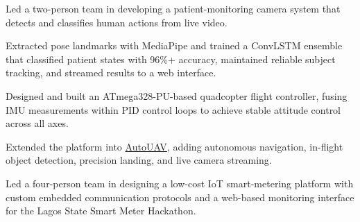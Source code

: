 
\begin{details}
    \item Led a two-person team in developing a patient-monitoring camera system that detects and classifies human actions from live video.
    \item Extracted pose landmarks with MediaPipe and trained a ConvLSTM ensemble that classified patient states with 96\%+ accuracy, maintained reliable subject tracking, and streamed results to a web interface.
\end{details}

\begin{details}
    \item Designed and built an ATmega328-PU-based quadcopter flight controller, fusing IMU measurements within PID control loops to achieve stable attitude control across all axes.
    \item Extended the platform into \href{https://www.nelsonelijah.com/projects/autouav}{AutoUAV}, adding autonomous navigation, in-flight object detection, precision landing, and live camera streaming.
\end{details}

\begin{details}
    \item Led a four-person team in designing a low-cost IoT smart-metering platform with custom embedded communication protocols and a web-based monitoring interface for the Lagos State Smart Meter Hackathon.
\end{details}
